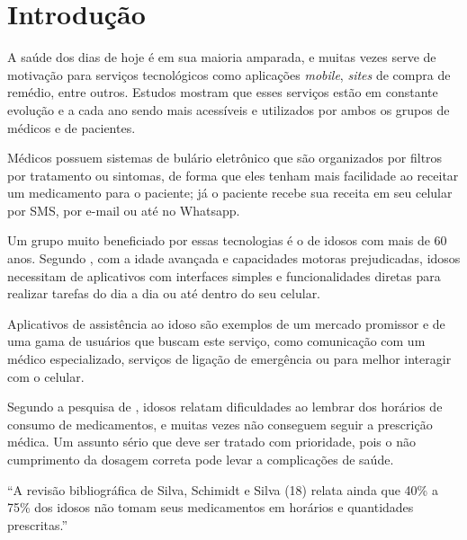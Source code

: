 \documentclass[
	article,			%
	12pt,				%
	oneside,			%
	a4paper,			%
    BIBLATEX,           %
	english,			%
	brazil,				%
	sumario=tradicional
	]{abntex2}
\begin{document}

\textual

\section{Introdução}

A saúde dos dias de hoje é em sua maioria amparada, e muitas vezes serve de motivação para serviços tecnológicos como aplicações \textit{mobile}, \textit{sites} de compra de remédio, entre outros. Estudos mostram que esses serviços estão em constante evolução e a cada ano sendo mais acessíveis e utilizados por ambos os grupos de médicos e de pacientes.

Médicos possuem sistemas de bulário eletrônico que são organizados por filtros por tratamento ou sintomas, de forma que eles tenham mais facilidade ao receitar um medicamento para o paciente; já o paciente recebe sua receita em seu celular por SMS, por e-mail ou até no Whatsapp.

Um grupo muito beneficiado por essas tecnologias é o de idosos com mais de 60 anos. Segundo , com a idade avançada e capacidades motoras prejudicadas, idosos necessitam de aplicativos com interfaces simples e funcionalidades diretas para realizar tarefas do dia a dia ou até dentro do seu celular.

Aplicativos de assistência ao idoso são exemplos de um mercado promissor e de uma gama de usuários que buscam este serviço, como comunicação com um médico especializado,  serviços de ligação de emergência ou para melhor interagir com o celular.

Segundo a pesquisa de , idosos relatam dificuldades ao lembrar dos horários de consumo de medicamentos, e muitas vezes não conseguem seguir a prescrição médica. Um assunto sério que deve ser tratado com prioridade, pois o não cumprimento da dosagem correta pode levar a complicações de saúde.

\begin{citacao}
“A revisão bibliográfica de Silva, Schimidt e Silva (18) relata ainda que 40\% a 75\% dos idosos não tomam seus medicamentos em horários e quantidades prescritas.” \cite{clarisse2016}
\end{citacao}
\end{document}
